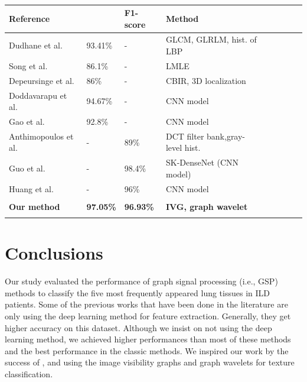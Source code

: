 \documentclass[conference]{IEEEtran}
\begin{document}
\begin{table}[tbh]
  \caption{}
  \label{cm:compare}
  \centering
  \scriptsize
  \begin{tabular}{@{}lllllllll@{}}
  \toprule
  \multirow{1}{0.8cm}{\textbf{Reference}} & \multirow{1}{0.7cm}{\centering{\textbf{Accuracy}}} & \multirow{1}{0.9cm}{\textbf{F1-score}} & \multirow{1}{2cm}{{\textbf{Method}}} \\ \midrule

Dudhane et al. \cite{acc934} & 93.41\% & - & GLCM, GLRLM, hist. of LBP\\ 
Song et al. \cite{acc861} & 86.1\% & - & LMLE \\ 
Depeursinge et al. \cite{acc86} & 86\% & - & CBIR, 3D localization\\ 
Doddavarapu et al. \cite{acc9467} & 94.67\% & - & CNN model\\ 
Gao et al.\cite{acc928} & 92.8\% & - & CNN model\\  
Anthimopoulos et al. \cite{Fscore89} & - & 89\% & DCT filter bank,gray-level hist.\\  
Guo et al. \cite{Fscore984} & - & 98.4\% & SK-DenseNet (CNN model)\\  
Huang et al. \cite{Fscore96} & - & 96\% & CNN model \\  \bottomrule

  \vspace{-0.23cm} \\ 
  \textbf{Our method} & \textbf{97.05\%} & \textbf{96.93\%} & \textbf{IVG, graph wavelet }\\ 
  \vspace{-0.3cm} \\ 
  \bottomrule
   
\end{tabular}
\end{table}



\section{Conclusions}
Our study evaluated the performance of graph signal processing (i.e., GSP) methods to classify the five most frequently appeared lung tissues in ILD patients. Some of the previous works that have been done in the literature are only using the deep learning method for feature extraction. Generally, they get higher accuracy on this dataset. Although we insist on not using the deep learning method, we achieved higher performances than most of these methods and the best performance in the classic methods. We inspired our work by the success of \cite{chinaIVG}, and \cite{wavelet} using the image visibility graphs and graph wavelets for texture classification.
\end{document}
